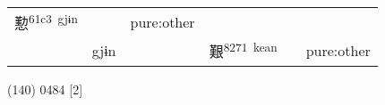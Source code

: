 \documentclass[14pt,a4paper]{scrartcl}
\begin{document}
\begin{longtable}[c]{@{}llllll@{}}
\begin{minipage}[t]{0.14\columnwidth}
懃\textsuperscript{61c3~gjɨn}
\strut\end{minipage} &
\begin{minipage}[t]{0.14\columnwidth}\raggedright\strut
\strut\end{minipage} &
\begin{minipage}[t]{0.14\columnwidth}\raggedright\strut
pure:other
\strut\end{minipage}\tabularnewline
\begin{minipage}[t]{0.14\columnwidth}\raggedright\strut
𡎸
\strut\end{minipage} &
\begin{minipage}[t]{0.14\columnwidth}\raggedright\strut
gjɨn
\strut\end{minipage} &
\begin{minipage}[t]{0.14\columnwidth}\raggedright\strut
\strut\end{minipage} &
\begin{minipage}[t]{0.14\columnwidth}\raggedright\strut
艱\textsuperscript{8271~kean}
\strut\end{minipage} &
\begin{minipage}[t]{0.14\columnwidth}\raggedright\strut
\strut\end{minipage} &
\begin{minipage}[t]{0.14\columnwidth}\raggedright\strut
pure:other
\strut\end{minipage}\tabularnewline
\bottomrule
\end{longtable}

(140) 0484 {[}2{]}
\end{document}
